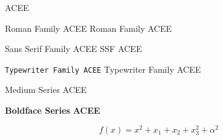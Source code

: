 \documentclass{article}
\begin{document}
    ACEE

    \textrm{Roman Family ACEE}
    \rmfamily Roman Family ACEE

    \textsf{Sans Serif Family ACEE}
    \sffamily SSF ACEE

    \texttt{Typewriter Family ACEE}
    \ttfamily Typewriter Family ACEE

    \textmd{Medium Series}
    \mdseries ACEE

    \textbf{Boldface Series}
    \bfseries ACEE
    
    $$f(x) = x^2 + x_1 + x_2 +x_3^2 + \alpha ^2$$
    
\end{document}

